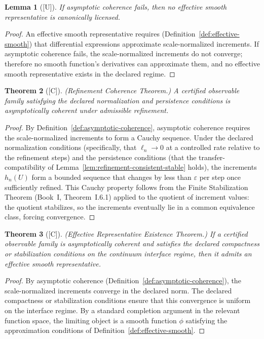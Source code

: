 \documentclass[12pt,oneside]{amsbook}
\theoremstyle{plain}
\newtheorem{theorem}{Theorem}[section]
\newtheorem{lemma}[theorem]{Lemma}
\theoremstyle{definition}
\theoremstyle{remark}
\newcommand{\status}[1]{\textup{[#1]}}
\begin{document}
\begin{lemma}[\status{U}]\label{lem:incoherence-blocks}
If asymptotic coherence fails, then no effective smooth representative
is canonically licensed.
\end{lemma}

\begin{proof}
An effective smooth representative requires (Definition~\ref{def:effective-smooth})
that differential expressions approximate scale-normalized increments.
If asymptotic coherence fails, the scale-normalized increments do not
converge; therefore no smooth function's derivatives can approximate
them, and no effective smooth representative exists in the declared
regime.
\end{proof}

\begin{theorem}[\status{C}]\label{thm:refinement-coherence}
\textup{(Refinement Coherence Theorem.)}  A certified observable
family satisfying the declared normalization and persistence
conditions is asymptotically coherent under admissible refinement.
\end{theorem}

\begin{proof}
By Definition~\ref{def:asymptotic-coherence}, asymptotic coherence
requires the scale-normalized increments to form a Cauchy sequence.
Under the declared normalization conditions (specifically, that $\ell_n
\to 0$ at a controlled rate relative to the refinement steps) and the
persistence conditions (that the transfer-compatibility of
Lemma~\ref{lem:refinement-consistent-stable} holds), the increments
$h_n(U)$ form a bounded sequence that changes by less than $\varepsilon$
per step once sufficiently refined.  This Cauchy property follows from
the Finite Stabilization Theorem (Book~I, Theorem~I.6.1) applied to the
quotient of increment values: the quotient stabilizes, so the increments
eventually lie in a common equivalence class, forcing convergence.
\end{proof}

\begin{theorem}[\status{C}]\label{thm:effective-rep-existence}
\textup{(Effective Representative Existence Theorem.)}  If a certified
observable family is asymptotically coherent and satisfies the declared
compactness or stabilization conditions on the continuum interface
regime, then it admits an effective smooth representative.
\end{theorem}

\begin{proof}
By asymptotic coherence (Definition~\ref{def:asymptotic-coherence}),
the scale-normalized increments converge in the declared norm.  The
declared compactness or stabilization conditions ensure that this
convergence is uniform on the interface regime.  By a standard
completion argument in the relevant function space, the limiting object
is a smooth function $\phi$ satisfying the approximation conditions of
Definition~\ref{def:effective-smooth}.
\end{proof}
\end{document}
